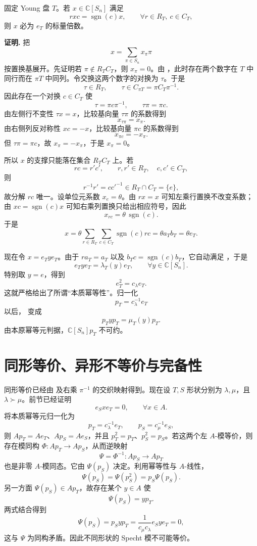 \begin{lemma}
固定 Young 盘 $T$。若 $x\in\mathbb C[S_n]$ 满足
\begin{equation}
rxc=\operatorname{sgn}(c)x,
\qquad
\forall r\in R_T,\ c\in C_T,
\label{eq:young-bi-equivariance}
\end{equation}
则 $x$ 必为 $e_T$ 的标量倍数。

\par\smallskip\noindent\textbf{证明.}
把
\[
x=\sum_{\pi\in S_n}x_\pi\pi
\]
按置换基展开。先证明若 $\pi\notin R_TC_T$，则 $x_\pi=0$。由 ，此时存在两个数字在 $T$ 中同行而在 $\pi T$ 中同列。令交换这两个数字的对换为 $\tau$。于是
\[
\tau\in R_T,
\qquad
\tau\in C_{\pi T}=\pi C_T\pi^{-1}.
\]
因此存在一个对换 $c\in C_T$ 使
\[
\tau=\pi c\pi^{-1},
\qquad
\tau\pi=\pi c.
\]
由左侧行不变性 $\tau x=x$，比较基向量 $\tau\pi$ 的系数得到
\[
x_{\tau\pi}=x_\pi.
\]
由右侧列反对称性 $xc=-x$，比较基向量 $\pi c$ 的系数得到
\[
x_{\pi c}=-x_\pi.
\]
但 $\tau\pi=\pi c$，故 $x_\pi=-x_\pi$，于是 $x_\pi=0$。

所以 $x$ 的支撑只能落在集合 $R_TC_T$ 上。若
\[
rc=r'c',
\qquad r,r'\in R_T,\quad c,c'\in C_T,
\]
则
\[
r^{-1}r'=cc'^{-1}\in R_T\cap C_T=\{e\},
\]
故分解 $rc$ 唯一。设单位元系数 $x_e=\theta$。由 $rx=x$ 可知左乘行置换不改变系数；由 $xc=\operatorname{sgn}(c)x$ 可知右乘列置换只给出相应符号，因此
\[
x_{rc}=\theta\,\operatorname{sgn}(c).
\]
于是
\[
x
=\theta\sum_{r\in R_T}\sum_{c\in C_T}\operatorname{sgn}(c)rc
=\theta a_Tb_T
=\theta e_T.
\]
\end{lemma}

现在令 $x=e_Tye_T$。由于 $r a_T=a_T$ 以及 $b_Tc=\operatorname{sgn}(c)b_T$，它自动满足 ，于是
\begin{equation}
e_Tye_T=\lambda_T(y)e_T,
\qquad \forall y\in\mathbb C[S_n].
\label{eq:ete-scalar}
\end{equation}
特别取 $y=e$，得到
\[
e_T^2=c_\lambda e_T.
\]
这就严格给出了所谓“本质幂等性”。归一化
\[
p_T=c_\lambda^{-1}e_T
\]
以后， 变成
\[
p_Typ_T=\mu_T(y)p_T.
\]
由本原幂等元判据，$\mathbb C[S_n]p_T$ 不可约。

\section{同形等价、异形不等价与完备性}

同形等价已经由  及右乘 $\pi^{-1}$ 的交织映射得到。现在设 $T,S$ 形状分别为 $\lambda,\mu$，且 $\lambda\succ\mu$。前节已经证明
\[
e_Sxe_T=0,
\qquad \forall x\in A.
\]
将本质幂等元归一化为
\[
p_T=c_\lambda^{-1}e_T,
\qquad
p_S=c_\mu^{-1}e_S,
\]
则 $Ap_T=Ae_T$、$Ap_S=Ae_S$，并且 $p_T^2=p_T$、$p_S^2=p_S$。若这两个左 $A$-模等价，则存在模同构 $\Phi:Ap_T\to Ap_S$，从而逆映射
\[
\Psi=\Phi^{-1}:Ap_S\to Ap_T
\]
也是非零 $A$-模同态。它由 $\Psi(p_S)$ 决定。利用幂等性与 $A$-线性，
\[
\Psi(p_S)=\Psi(p_S^2)=p_S\Psi(p_S).
\]
另一方面 $\Psi(p_S)\in Ap_T$，故存在某个 $y\in A$ 使
\[
\Psi(p_S)=yp_T.
\]
两式结合得到
\[
\Psi(p_S)=p_Syp_T
=\frac{1}{c_\mu c_\lambda}e_Sye_T=0,
\]
这与 $\Psi$ 为同构矛盾。因此不同形状的 Specht 模不可能等价。


